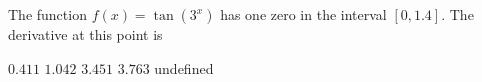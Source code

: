 \begin{questions}
    \question The function $f(x) = \tan \left(3^x\right)$ has one zero in the interval $[0, 1.4]$.  The derivative at this point is  \\

    \begin{oneparchoices}
        \choice $0.411$
        \choice $1.042$
        \choice $3.451$
        \choice $3.763$
        \choice undefined
    \end{oneparchoices} \par \horizontalline

\end{questions}